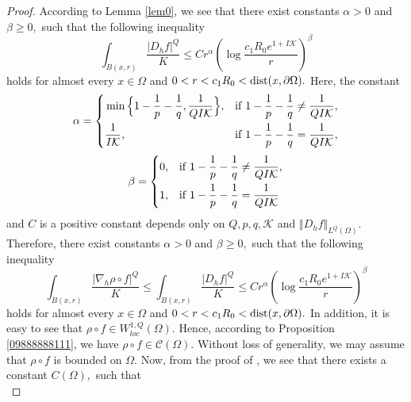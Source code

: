 \documentclass[11pt,twoside]{article}
\theoremstyle{definition}
\theoremstyle{remark}
\newcommand{\abs}[1]{\left|#1\right|}
\begin{document}
\begin{proof}
According to Lemma
\ref{lem0}, we see that there exist constants $\alpha>0$ and $\beta\geq0,$ such that the following inequality 
\begin{equation}\label{96giiuo}
\int_{B(x,r)}\frac{\abs{ D_{h}f}^{Q}}{K}\leq C r^{\alpha}\left(\log\frac{c_{1}R_{0}e^{1+I\mathcal{K}}}{r}\right)^{\beta}
\end{equation}
holds for almost every $x\in\Omega$ and $0<r<c_{1}R_{0}<{\rm dist}(x,\partial\Omega).$ Here, the constant 
 \begin{equation}\label{96giiuasaso}
  \alpha=\left\{
\begin{aligned}
&\min\Big\{1-\frac{1}{p}-\frac{1}{q},\frac{1}{QI\mathcal{K}}\Big\},       &      & {\rm if}\; {1-\frac{1}{p}-\frac{1}{q}\neq\frac{1}{QI\mathcal{K}}},\\
&\frac{1}{I\mathcal{K}},       &      &{\rm if}\; {1-\frac{1}{p}-\frac{1}{q}=\frac{1}{QI\mathcal{K}}},
\end{aligned} \right.
\end{equation}
 \begin{equation}\label{96giiuasasosdsscsccvr}
  \beta=\left\{
\begin{aligned}
&0,       &      & {\rm if}\; {1-\frac{1}{p}-\frac{1}{q}\neq\frac{1}{QI\mathcal{K}}},\\
&1,       &      &{\rm if}\; {1-\frac{1}{p}-\frac{1}{q}=\frac{1}{QI\mathcal{K}}}
\end{aligned} \right.
\end{equation}
and $C$ is a positive constant depends only on $Q,  p, q,\mathcal{K}$ and $\Vert D_{h}f\Vert_{L^{Q}(\Omega)}.$ Therefore, there exist constants $\alpha>0$ and $\beta\geq0,$ such that the following inequality 
\begin{equation}
\int_{B(x,r)}\frac{\abs{ \nabla_{h}\rho\circ f}^{Q}}{K}\leq\int_{B(x,r)}\frac{\abs{ D_{h}f}^{Q}}{K}\leq C r^{\alpha}\left(\log\frac{c_{1}R_{0}e^{1+I\mathcal{K}}}{r}\right)^{\beta}
\end{equation}
holds for almost every $x\in\Omega$ and $0<r<c_{1}R_{0}<{\rm dist}(x,\partial\Omega).$ In addition, it is easy to see that $\rho\circ f\in W_{loc}^{1,Q}(\Omega).$
Hence, according to Proposition \ref{09888888111}, we have $\rho\circ f\in\mathcal{C}(\Omega).$ Without loss of generality, we may 
assume that $\rho\circ f$ is bounded on $\Omega.$ Now, from the proof of \cite[Proposition 5]{Vod96}, we see that there exists a constant $C(\Omega),$ such that 
\begin{equation}\label{100000}

\end{equation}
\end{proof}
\end{document}

